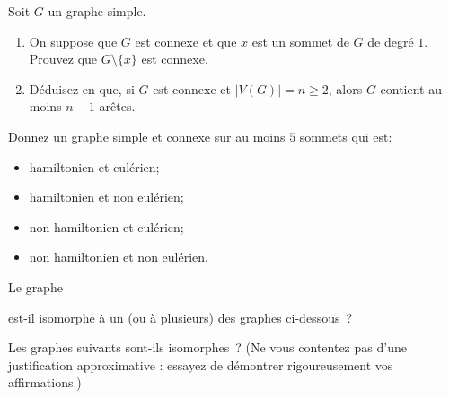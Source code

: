 \documentclass[11pt, a4paper]{article}
\begin{document}
\begin{exo}
Soit $G$ un graphe simple.
\begin{enumerate}
\item On suppose que $G$ est connexe et que $x$ est un sommet de $G$ de degr\'e $1$. Prouvez que $G\setminus\{x\}$ est connexe.
\item D\'eduisez-en que, si $G$ est connexe et $|V(G)|=n\geq 2$, alors $G$ contient au moins $n-1$ ar\^etes.
\end{enumerate}
\end{exo}

\begin{exo}
Donnez un graphe simple et connexe sur au moins $5$ sommets qui est:
\begin{itemize}
\item hamiltonien et eul\'erien;
\item hamiltonien et non eul\'erien;
\item non hamiltonien et eul\'erien;
\item non hamiltonien et non eul\'erien.
\end{itemize}
\end{exo}

\begin{exo}
Le graphe

\begin{center}
\scalebox{.825}{}
\end{center}

est-il isomorphe \`a un (ou \`a plusieurs) des graphes ci-dessous~?

\begin{center}
\scalebox{.825}{}
\end{center}
\end{exo}

\newpage
\begin{exo}
Les graphes suivants sont-ils isomorphes~? (Ne vous contentez pas d'une justification approximative : essayez de d\'emontrer rigoureusement vos affirmations.)

\begin{figure}[h!]
\centering

\caption{}
\end{figure}%

\begin{figure}[h!]
\centering

\caption{}
\end{figure}

\begin{figure}[h!]
\centering

\caption{}
\end{figure}

\end{exo}
\end{document}
